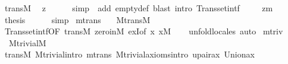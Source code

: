 \begin{isabellebody}
\ trans{\isacharunderscore}{\kern0pt}M\ \isamarkupfalse%
\ {\isachardoublequoteopen}z{\isacharequal}{\kern0pt}{}{\isachardoublequoteclose}\isanewline
\ \ \ \ \isamarkupfalse%
\ {\isacharparenleft}{\kern0pt}simp\ \ add{\isacharcolon}{\kern0pt}\ empty{\isacharunderscore}{\kern0pt}def{\isacharcomma}{\kern0pt}\ blast\ intro{\isacharcolon}{\kern0pt}\ Transset{\isacharunderscore}{\kern0pt}intf\ {\isacharparenright}{\kern0pt}\isanewline
\ \ \isamarkupfalse%
\ zm\ \isamarkupfalse%
\ {\isacharquery}{\kern0pt}thesis\isanewline
\ \ \ \ \isamarkupfalse%
\ simp\isanewline
{}\isamarkupfalse%
%
\endisatagproof
{\isafoldproof}%
%
\isadelimproof
%
\endisadelimproof
%
\isadelimdocument
%
\endisadelimdocument
%
\isatagdocument
%
\isamarkuptrue%
%
\endisatagdocument
{\isafolddocument}%
%
\isadelimdocument
%
\endisadelimdocument
{}\isamarkupfalse%
\ mtrans\ {\isacharcolon}{\kern0pt}\isanewline
\ \ {\isachardoublequoteopen}M{\isacharunderscore}{\kern0pt}trans{\isacharparenleft}{\kern0pt}{\isacharhash}{\kern0pt}{\isacharhash}{\kern0pt}M{\isacharparenright}{\kern0pt}{\isachardoublequoteclose}\isanewline
%
\isadelimproof
\ \ %
\endisadelimproof
%
\isatagproof
{}\isamarkupfalse%
\ Transset{\isacharunderscore}{\kern0pt}intf{\isacharbrackleft}{\kern0pt}OF\ trans{\isacharunderscore}{\kern0pt}M{\isacharbrackright}{\kern0pt}\ zero{\isacharunderscore}{\kern0pt}in{\isacharunderscore}{\kern0pt}M\ exI{\isacharbrackleft}{\kern0pt}of\ {\isachardoublequoteopen}{\isasymlambda}x{\isachardot}{\kern0pt}\ x{\isasymin}M{\isachardoublequoteclose}{\isacharbrackright}{\kern0pt}\isanewline
\ \ \isamarkupfalse%
\ unfold{\isacharunderscore}{\kern0pt}locales\ auto%
\endisatagproof
{\isafoldproof}%
%
\isadelimproof
\isanewline
%
\endisadelimproof
\isanewline
\isanewline
{}\isamarkupfalse%
\ mtriv\ {\isacharcolon}{\kern0pt}\isanewline
\ \ {\isachardoublequoteopen}M{\isacharunderscore}{\kern0pt}trivial{\isacharparenleft}{\kern0pt}{\isacharhash}{\kern0pt}{\isacharhash}{\kern0pt}M{\isacharparenright}{\kern0pt}{\isachardoublequoteclose}\isanewline
%
\isadelimproof
\ \ %
\endisadelimproof
%
\isatagproof
{}\isamarkupfalse%
\ trans{\isacharunderscore}{\kern0pt}M\ M{\isacharunderscore}{\kern0pt}trivial{\isachardot}{\kern0pt}intro\ mtrans\ M{\isacharunderscore}{\kern0pt}trivial{\isacharunderscore}{\kern0pt}axioms{\isachardot}{\kern0pt}intro\ upair{\isacharunderscore}{\kern0pt}ax\ Union{\isacharunderscore}{\kern0pt}ax\isanewline

\end{isabellebody}
